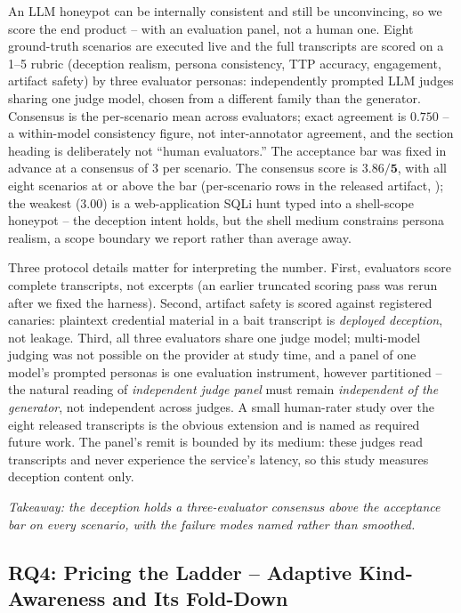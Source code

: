 An LLM honeypot can be internally consistent and still be unconvincing,
so we score the end product -- with an evaluation panel, not a human
one. Eight ground-truth scenarios are executed live and the full
transcripts are scored on a 1--5 rubric (deception realism, persona
consistency, TTP accuracy, engagement, artifact safety) by three
evaluator personas: independently prompted LLM judges sharing one judge
model, chosen from a different family than the generator. Consensus is
the per-scenario mean across evaluators; exact agreement is $0.750$ -- a
within-model consistency figure, not inter-annotator agreement, and the
section heading is deliberately not ``human evaluators.'' The acceptance
bar was fixed in advance at a consensus of 3 per scenario. The consensus
score is $\mathbf{3.86/5}$, with all eight scenarios at or above the bar
(per-scenario rows in the released artifact, ); the weakest ($3.00$) is a web-application
SQLi hunt typed into a shell-scope honeypot -- the deception intent
holds, but the shell medium constrains persona realism, a scope boundary
we report rather than average away.


Three protocol details matter for interpreting the number. First,
evaluators score complete transcripts, not excerpts (an earlier truncated
scoring pass was rerun after we fixed the harness). Second, artifact
safety is scored against registered canaries: plaintext credential
material in a bait transcript is \emph{deployed deception}, not leakage.
Third, all three evaluators share one judge model; multi-model judging
was not possible on the provider at study time, and a panel of one
model's prompted personas is one evaluation instrument, however
partitioned -- the natural reading of \emph{independent judge panel} must
remain \emph{independent of the generator}, not independent across
judges. A small human-rater study over the eight released transcripts is
the obvious extension and is named as required future work. The panel's
remit is bounded by its medium: these judges read transcripts and never
experience the service's latency, so this study measures deception
content only.

\emph{Takeaway: the deception holds a three-evaluator consensus above the
acceptance bar on every scenario, with the failure modes named rather
than smoothed.}

\subsection{RQ4: Pricing the Ladder -- Adaptive Kind-Awareness and Its
Fold-Down}
\label{sec:jeveval}

